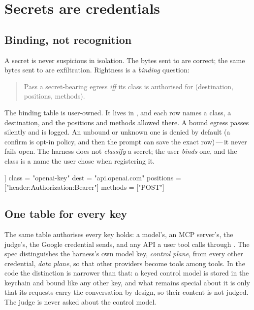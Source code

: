 \chapter{Secrets are credentials}

\section{Binding, not recognition}

A secret is never suspicious in isolation. The bytes  sent to
 are correct; the same bytes sent to
 are exfiltration. Rightness is a \emph{binding}
question:

\begin{quote}
Pass a secret-bearing egress \emph{iff} its class is authorised for
(destination, positions, methods).
\end{quote}

The binding table is user-owned. It lives in , and
each row names a class, a destination, and the positions and methods
allowed there. A bound egress passes
silently and is logged. An unbound or unknown one is denied by default (a
confirm is opt-in policy, and then the prompt can save the exact row)\,---\,it
never fails open. The harness does not \emph{classify} a secret; the user
\emph{binds} one, and the class is a name the user chose when registering it.

\begin{txt}
[[bind]]
class = "openai-key"
dest = "api.openai.com"
positions = ["header:Authorization:Bearer"]
methods = ["POST"]
\end{txt}

\section{One table for every key}

The same table authorises every key \nodwyn{} holds: a model's, an MCP
server's, the judge's, the Google credential 
sends, and any API a user tool calls through . The spec distinguishes the harness's own model key,
\emph{control plane}, from every other credential, \emph{data plane}, so
that other providers become tools among tools. In the code the distinction
is narrower than that: a keyed control model is stored in the keychain and
bound like any other key, and what remains special about it is only that
its requests carry the conversation by design, so their content is not
judged. The judge is never asked about the control model.

